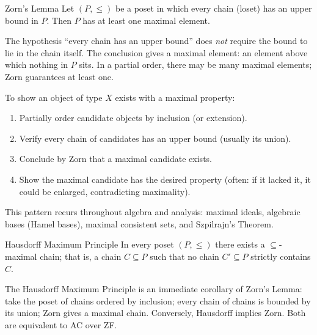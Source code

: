 \begin{theorembox}{Zorn's Lemma}
\label{thm:zorn}
Let $(P, \leq)$ be a poset in which every chain (loset) has an upper bound
in $P$. Then $P$ has at least one maximal element.
\end{theorembox}

\begin{remark*}
The hypothesis ``every chain has an upper bound'' does \emph{not} require
the bound to lie in the chain itself. The conclusion gives a maximal
element: an element above which nothing in $P$ sits. In a partial order,
there may be many maximal elements; Zorn guarantees at least one.
\end{remark*}

\begin{remark*}
To show an object of type $X$ exists with a maximal property:
\begin{enumerate}
  \item Partially order candidate objects by inclusion (or extension).
  \item Verify every chain of candidates has an upper bound (usually its union).
  \item Conclude by Zorn that a maximal candidate exists.
  \item Show the maximal candidate has the desired property (often: if it
        lacked it, it could be enlarged, contradicting maximality).
\end{enumerate}
This pattern recurs throughout algebra and analysis: maximal ideals,
algebraic bases (Hamel bases), maximal consistent sets, and Szpilrajn's Theorem.
\end{remark*}

\begin{theorembox}{Hausdorff Maximum Principle}
\label{thm:hausdorff}
In every poset $(P, \leq)$ there exists a $\subseteq$-maximal chain; that
is, a chain $C \subseteq P$ such that no chain $C' \subseteq P$ strictly
contains $C$.
\end{theorembox}

\begin{remark*}
The Hausdorff Maximum Principle is an immediate corollary of Zorn's Lemma:
take the poset of chains ordered by inclusion; every chain of chains is
bounded by its union; Zorn gives a maximal chain. Conversely, Hausdorff
implies Zorn. Both are equivalent to AC over ZF.
\end{remark*}

